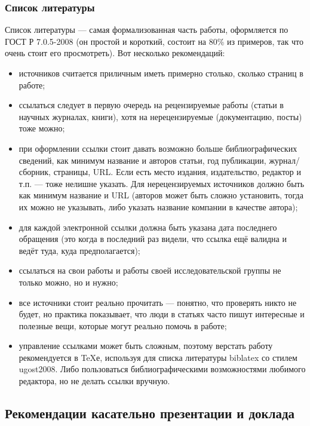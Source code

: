\documentclass{article}
\begin{document}
\subsubsection{Список литературы}

Список литературы --- самая формализованная часть работы, оформляется по ГОСТ Р 7.0.5-2008 (он простой и короткий, состоит на 80\% из примеров, так что очень стоит его просмотреть). Вот несколько рекомендаций:

\begin{itemize}
    \item источников считается приличным иметь примерно столько, сколько страниц в работе;
    \item ссылаться следует в первую очередь на рецензируемые работы (статьи в научных журналах, книги), хотя на нерецензируемые (документацию, посты) тоже можно;
    \item при оформлении ссылки стоит давать возможно больше библиографических сведений, как минимум название и авторов статьи, год публикации, журнал/сборник, страницы, URL. Если есть место издания, издательство, редактор и т.п. --- тоже нелишне указать. Для нерецензируемых источников должно быть как минимум название и URL (авторов может быть сложно установить, тогда их можно не указывать, либо указать название компании в качестве автора);
    \item для каждой электронной ссылки должна быть указана дата последнего обращения (это когда в последний раз видели, что ссылка ещё валидна и ведёт туда, куда предполагается);
    \item ссылаться на свои работы и работы своей исследовательской группы не только можно, но и нужно;
    \item все источники стоит реально прочитать --- понятно, что проверять никто не будет, но практика показывает, что люди в статьях часто пишут интересные и полезные вещи, которые могут реально помочь в работе;
    \item управление ссылками может быть сложным, поэтому верстать работу рекомендуется в TeXе, используя для списка литературы biblatex со стилем ugost2008. Либо пользоваться библиографическими возможностями любимого редактора, но не делать ссылки вручную.
\end{itemize}

\subsection{Рекомендации касательно презентации и доклада}
\end{document}
